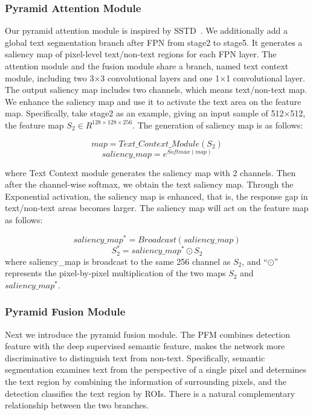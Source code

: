 \documentclass[letterpaper]{article} \usepackage{aaai19}  \usepackage{times}  \usepackage{helvet}  \usepackage{courier}  \usepackage{url}  \usepackage{graphicx}
\begin{document}
 \subsubsection{Pyramid Attention Module}
 Our pyramid attention module is inspired by SSTD~\cite{he2017single}. We additionally add a global text segmentation branch after FPN from stage2 to stage5.
It generates a saliency map of pixel-level text/non-text regions for each FPN layer. 
The attention module and the fusion module share a branch, named text context module, including two 3$\times$3 convolutional layers and one 1$\times$1 convolutional layer.
The output saliency map includes two channels, which means text/non-text map. 
We enhance the saliency map and use it to activate the text area on the feature map.
Specifically, take stage2 as an example, giving an input sample of 512$\times$512, the feature map \begin{math}
S_2 \in R^{128\times128\times256}
\end{math}. 
The generation of saliency map is as follows:


\begin{equation}
\label{gongshi1}
map = Text\_Context\_Module(S_{2})
\end{equation}
\begin{equation}
\label{gongshi2}
saliency\_map = e^{Softmax(map)}
\end{equation}

where Text Context module generates the saliency map with 2 channels. Then after the channel-wise softmax, we obtain the text saliency map. Through the Exponential activation, the saliency map is enhanced, that is, the response gap in text/non-text areas becomes larger.
The saliency map will act on the feature map as follows:

\begin{equation}
\label{gongshi3}
saliency\_map^* = Broadcast(saliency\_map)
\end{equation}
\begin{equation}
\label{gongshi4}
S_2^* = saliency\_map^* \odot S_2
\end{equation}
where saliency\_map is broadcast to the same 256 channel as $S_2$, 
and ``$\odot$'' represents the pixel-by-pixel multiplication of the two maps $S_2$ and $saliency\_map^*$.


\subsubsection{Pyramid Fusion Module}
Next we introduce the pyramid fusion module.
The PFM combines detection feature with the deep supervised semantic feature, makes the network more discriminative to distinguish text from non-text.
Specifically, semantic segmentation examines text from the perspective of a single pixel and determines the text region by combining the information of surrounding pixels, and the detection classifies the text region by ROIs.
There is a natural complementary relationship between the two branches.
\end{document}
